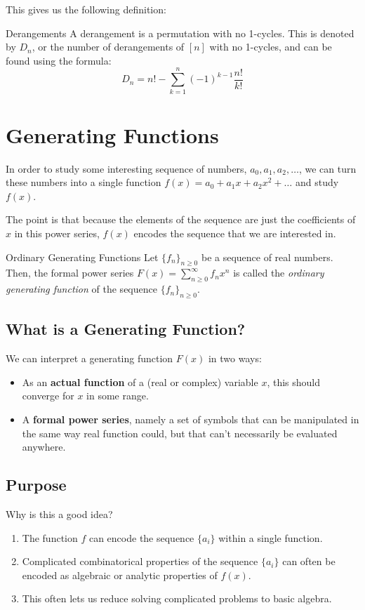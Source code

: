 \documentclass[letterpaper]{article}
\begin{document}
This gives us the following definition: 
\begin{definition}{Derangements}{}
    A derangement is a permutation with no 1-cycles. This is denoted by $D_n$, or the number of derangements of $[n]$ with no 1-cycles, and can be found using the formula:
    \[D_n = n! - \sum_{k = 1}^n (-1)^{k - 1} \frac{n!}{k!}\]
\end{definition}



\newpage 
\section{Generating Functions}
In order to study some interesting sequence of numbers, $a_0, a_1, a_2, \dots$, we can turn these numbers into a single function $f(x) = a_0 + a_{1}x + a_{2}x^2 + \dots$ and study $f(x)$. 

\bigskip 

The point is that because the elements of the sequence are just the coefficients of $x$ in this power series, $f(x)$ encodes the sequence that we are interested in.

\begin{definition}{Ordinary Generating Functions}{}
    Let $\{f_n\}_{n \geq 0}$ be a sequence of real numbers. Then, the formal power series $F(x) = \sum_{n \geq 0}^{\infty} f_n x^n$ is called the \emph{ordinary generating function} of the sequence $\{f_n\}_{n \geq 0}$. 
\end{definition}

\subsection{What is a Generating Function?}
We can interpret a generating function $F(x)$ in two ways: 
\begin{itemize}
    \item As an \textbf{actual function} of a (real or complex) variable $x$, this should converge for $x$ in some range. 
    \item A \textbf{formal power series}, namely a set of symbols that can be manipulated in the same way real function could, but that can't necessarily be evaluated anywhere. 
\end{itemize}


\subsection{Purpose}
Why is this a good idea? 
\begin{enumerate}
    \item The function $f$ can encode the sequence $\{a_i\}$ within a single function. 
    \item Complicated combinatorical properties of the sequence $\{a_i\}$ can often be encoded as algebraic or analytic properties of $f(x)$. 
    \item This often lets us reduce solving complicated problems to basic algebra.  
\end{enumerate}
\end{document}
